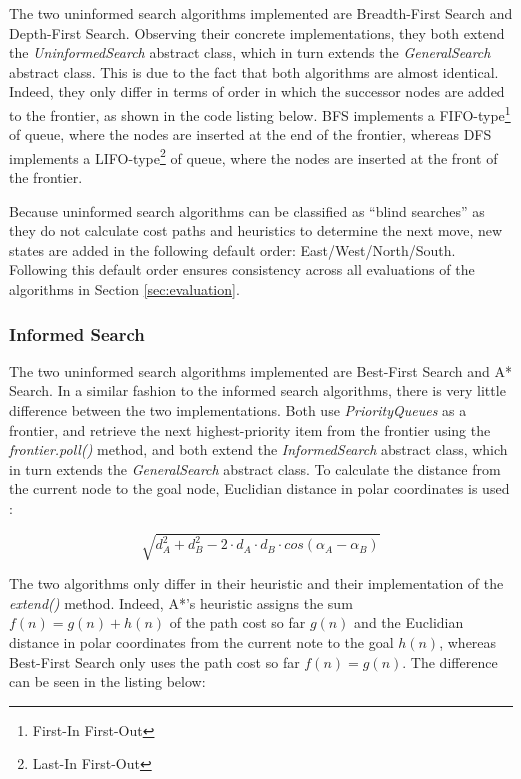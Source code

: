 \documentclass[letterpaper,12pt]{article}
\begin{document}
The two uninformed search algorithms implemented are Breadth-First Search and Depth-First Search. Observing their concrete implementations, they both extend the \textit{UninformedSearch} abstract class, which in turn extends the \textit{GeneralSearch} abstract class. This is due to the fact that both algorithms are almost identical. Indeed, they only differ in terms of order in which the successor nodes are added to the frontier, as shown in the code listing below. BFS implements a FIFO-type\footnote{First-In First-Out} of queue, where the nodes are inserted at the end of the frontier, whereas DFS implements a LIFO-type\footnote{Last-In First-Out} of queue, where the nodes are inserted at the front of the frontier.



Because uninformed search algorithms can be classified as ``blind searches'' as they do not calculate cost paths and heuristics to determine the next move, new states are added in the following default order: East/West/North/South. Following this default order ensures consistency across all evaluations of the algorithms in Section \ref{sec:evaluation}.


\subsubsection{Informed Search}

The two uninformed search algorithms implemented are Best-First Search and A* Search. In a similar fashion to the informed search algorithms, there is very little difference between the two implementations. Both use \textit{PriorityQueues} as a frontier, and retrieve the next highest-priority item from the frontier using the \textit{frontier.poll()} method, and both extend the \textit{InformedSearch} abstract class, which in turn extends the \textit{GeneralSearch} abstract class. To calculate the distance from the current node to the goal node, Euclidian distance in polar coordinates is used \cite{polarcoordinateseuclidian}:

\begin{equation}
    \sqrt{d_{A}^{2} + d_{B}^{2} - 2\cdot d_A\cdot d_B \cdot cos(\alpha_A - \alpha_B)}
\end{equation}

The two algorithms only differ in their heuristic and their implementation of the \textit{extend()} method. Indeed, A*'s heuristic assigns the sum $f(n) = g(n)+h(n)$ of the path cost so far $g(n)$ and the Euclidian distance in polar coordinates from the current note to the goal $h(n)$, whereas Best-First Search only uses the path cost so far $f(n)=g(n)$. The difference can be seen in the listing below:
\end{document}
